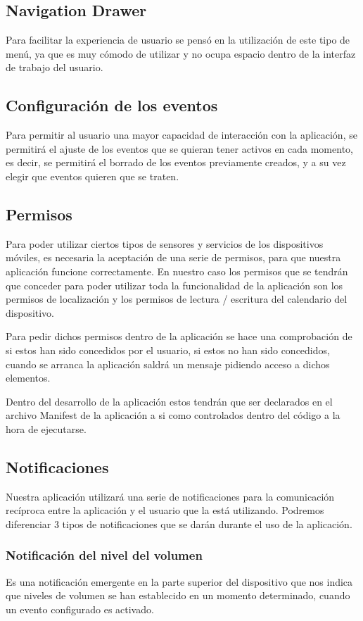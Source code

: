 \subsection{Navigation Drawer}
Para facilitar la experiencia de usuario se pensó en la utilización de este tipo de menú, ya que es muy cómodo de utilizar y no ocupa espacio dentro de la interfaz de trabajo del usuario.

\subsection{Configuración de los eventos}
Para permitir al usuario una mayor capacidad de interacción con la aplicación, se permitirá el ajuste de los eventos que se quieran tener activos en cada momento, es decir, se permitirá el borrado de los eventos previamente creados, y a su vez elegir que eventos quieren que se traten.

\subsection{Permisos}
Para poder utilizar ciertos tipos de sensores y servicios de los dispositivos móviles, es necesaria la aceptación de una serie de permisos, para que nuestra aplicación funcione correctamente. En nuestro caso los permisos que se tendrán que conceder para poder utilizar toda la funcionalidad de la aplicación son los permisos de localización y los permisos de lectura / escritura del calendario del dispositivo.

Para pedir dichos permisos dentro de la aplicación se hace una comprobación de si estos han sido concedidos por el usuario, si estos no han sido concedidos, cuando se arranca la aplicación saldrá un mensaje pidiendo acceso a dichos elementos.

Dentro del desarrollo de la aplicación estos tendrán que ser declarados en el archivo Manifest de la aplicación a si como controlados dentro del código a la hora de ejecutarse.

\subsection{Notificaciones}
Nuestra aplicación utilizará una serie de notificaciones para la comunicación recíproca entre la aplicación y el usuario que la está utilizando. Podremos diferenciar 3 tipos de notificaciones que se darán durante el uso de la aplicación.

\subsubsection{Notificación del nivel del volumen}
Es una notificación emergente en la parte superior del dispositivo que nos indica que  niveles de volumen se han establecido en un momento determinado, cuando un evento configurado es activado.
